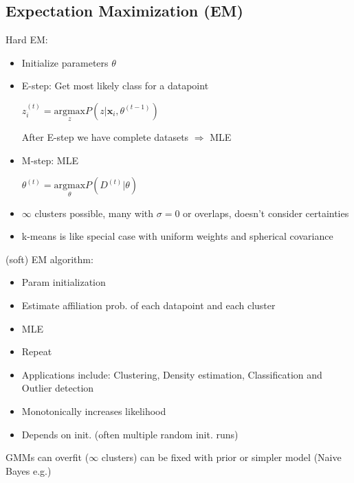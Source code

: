 \subsection{Expectation Maximization (EM)}

\begin{multicols*}{2}
    Hard EM:
    \begin{itemize}
        \item Initialize parameters $\theta$
        \item E-step: Get most likely class for a datapoint
        
        $z_i^{(t)} = \underset{z}{\text{argmax}} P(z|\boldsymbol{x}_i,\theta^{(t-1)})$
    
        After E-step we have complete datasets $\Rightarrow$ MLE
        \item M-step: MLE
    
        $\theta^{(t)} = \underset{\theta}{\text{argmax}}P(D^{(t)}|\theta)$
        \item \color{Red}$\infty$ clusters possible, many with $\sigma = 0$ or overlaps, doesn't consider certainties\color{black}
        \item k-means is like special case with uniform weights and spherical covariance
    \end{itemize}
    
    (soft) EM algorithm:
    \begin{itemize}
        \item Param initialization
        \item Estimate affiliation prob. of each datapoint and each cluster
        \item MLE
        \item Repeat
        \item Applications include: Clustering, Density estimation, Classification and Outlier detection
        \item Monotonically increases likelihood
        \item Depends on init. (often multiple random init. runs)
    \end{itemize}
\end{multicols*}

GMMs can overfit ($\infty$ clusters) can be fixed with prior or simpler model (Naive Bayes e.g.)

